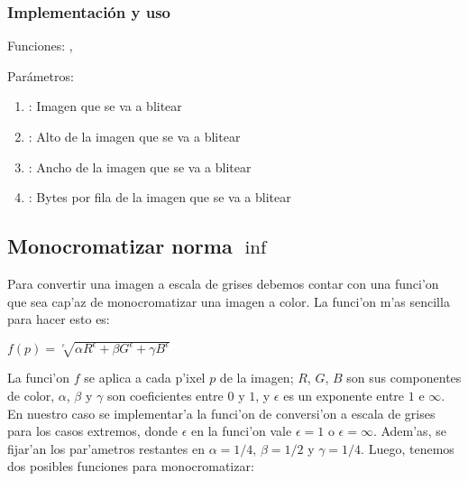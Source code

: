 
\subsubsection*{Implementación y uso}
\noindent Funciones: , 

\noindent Parámetros:
\begin{enumerate}[-]
\item {}: Imagen que se va a blitear
\item {}: Alto de la imagen que se va a blitear
\item {}: Ancho de la imagen que se va a blitear
\item {}: Bytes por fila de la imagen que se va a blitear
\end{enumerate}



\subsection{Monocromatizar norma $\inf$ } %

Para convertir una imagen a escala de grises debemos contar con una funci'on 
que sea cap'az de monocromatizar una imagen a color. La funci'on m'as sencilla 
para hacer esto es:

\begin{center}
  $f(p) = \sqrt[\epsilon]{\alpha R^\epsilon + \beta G^\epsilon + 
    \gamma B^\epsilon}$
\end{center}

La funci'on $f$ se aplica a cada p'ixel $p$ de la imagen; $R$, $G$, $B$ son 
sus componentes de color, $\alpha$, $\beta$ y $\gamma$ son coeficientes entre 
$0$ y $1$, y $\epsilon$ es un exponente entre $1$ e $\infty$.\\

En nuestro caso se implementar'a la funci'on de conversi'on a escala de grises 
para los casos extremos, donde $\epsilon$ en la funci'on vale $\epsilon = 1$ o 
$\epsilon = \infty$. Adem'as, se fijar'an los par'ametros restantes en 
$\alpha = 1/4$, $\beta = 1/2$ y $\gamma = 1/4$. Luego, tenemos dos posibles
funciones para monocromatizar:


